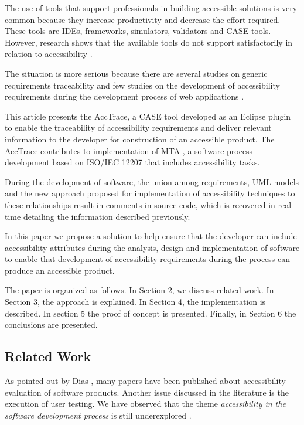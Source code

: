 \documentclass[10pt, conference, compsocconf]{IEEEtran}
\begin{document}
The use of tools that support professionals in building accessible solutions is very common because they increase productivity and decrease the effort required. These tools are IDEs, frameworks, simulators, validators and CASE tools. However, research shows that the available tools do not support satisfactorily in relation to accessibility \cite{Trewin:2010:ACT:1805986.1806029}.

The situation is more serious because there are several studies on generic requirements traceability \cite{5970169,292398,5485417,6405269} and few studies on the development of accessibility requirements during the development process of web applications \cite{analuizadias:2010}.

This article presents the AccTrace, a CASE tool developed as an
Eclipse plugin to enable the traceability of accessibility requirements
and deliver relevant information to the developer for
construction of an accessible product. The AccTrace contributes to implementation of MTA \cite{maia:10}, a software process
development based on ISO/IEC 12207 that includes accessibility tasks.

During the development of software, the union among requirements, UML models and the new
approach proposed for implementation of accessibility techniques 
to these relationships result in comments in source code, which is recovered in real time detailing the
information described previously.

In this paper we propose a solution to help ensure that the developer can include accessibility attributes
during the analysis, design and implementation of software to enable that development of accessibility requirements
during the process can produce an accessible product.

The paper is organized as follows. In Section 2, we discuss related work. In Section 3, the approach is explained. In Section 4, the implementation is described. In section 5 the proof of concept is presented. Finally, in Section 6 the conclusions are presented.

\subsection{Related Work}

As pointed out by Dias \cite{analuizadias:2010}, many papers have been published about accessibility evaluation of software products. Another issue discussed in the literature is the execution of user testing. We have observed that the theme \textit {accessibility in the software development process}
is still underexplored \cite{maia:10}.
\end{document}
